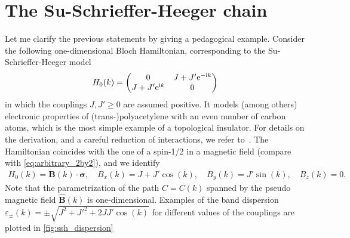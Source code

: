\section{The Su-Schrieffer-Heeger chain}
\label{sec:the_SSH_chain}
%
%
Let me clarify the previous statements by giving a pedagogical example.
Consider the following one-dimensional Bloch Hamiltonian, corresponding to the Su-Schrieffer-Heeger model
\begin{align}
    H_0(k)
    =
    \begin{pmatrix}
        0 & J+J'\mathrm e^{-\mathrm i k}\\
        J+J'\mathrm e^{\mathrm i k} & 0
    \end{pmatrix}
    \label{eq:SSH_momentum_space}
\end{align}
in which the couplings $J,J'\geq0$ are assumed positive.
It models (among others) electronic properties of (trans-)poly\-acetylene with an even number of carbon atoms, which is the most simple example of a topological insulator.
For details on the derivation, and a careful reduction of interactions, we refer to~\cite{Heeger1988}.
The Hamiltonian coincides with the one of a spin-1/2 in a magnetic field (compare with \ref{eq:arbitrary_2by2}), and we identify
\begin{align}
    H_0(k) = {\bm B}(k)\cdot{\bm\sigma},
    \quad
    B_x(k) = J+J'\cos(k),
    \quad
    B_y(k) = J'\sin(k),
    \quad
    B_z(k) = 0.
\end{align}
Note that the parametrization of the path $C=C(k)$ spanned by the pseudo magnetic field $\hat{\bm B}(k)$ is one-dimensional.
Examples of the band dispersion $\varepsilon_\pm(k)=\pm\sqrt{J^2+J'^2+2JJ'\cos(k)}$ for different values of the couplings are plotted in \cref{fig:ssh_dispersion}
